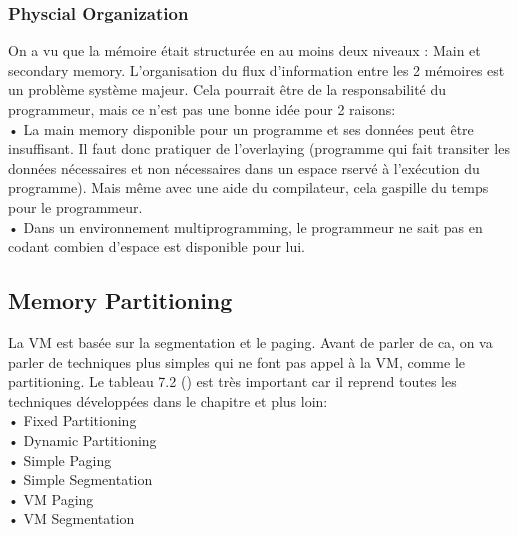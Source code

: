 \subsubsection{Physcial Organization}
On a vu que la mémoire était structurée en au moins deux niveaux : Main et secondary memory.
L'organisation du flux d'information entre les 2 mémoires est un problème système majeur.
Cela pourrait être de la responsabilité du programmeur, mais ce n'est pas une bonne idée pour 2 raisons: \\
• La main memory disponible pour un programme et ses données peut être insuffisant.
Il faut donc pratiquer de l'overlaying (programme qui fait transiter les données nécessaires et non nécessaires dans un espace rservé à l'exécution du programme).
Mais même avec une aide du compilateur, cela gaspille du temps pour le programmeur.
\\
• Dans un environnement multiprogramming, le programmeur ne sait pas en codant combien d'espace est disponible pour lui.
\subsection{Memory Partitioning}
La VM est basée sur la segmentation et le paging.
Avant de parler de ca, on va parler de techniques plus simples qui ne font pas appel à la VM, comme le partitioning.
Le tableau 7.2 (\cite[p.~311]{stallings}) est très important car il reprend toutes les techniques développées dans le chapitre et plus loin: \\
• Fixed Partitioning \\
• Dynamic Partitioning \\
• Simple Paging \\
• Simple Segmentation \\
• VM Paging \\
• VM Segmentation \\
